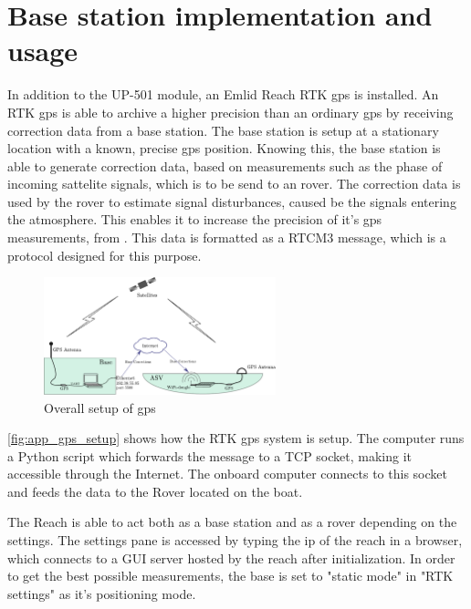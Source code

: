 \section{Base station implementation and usage}
In addition to the UP-501 module, an Emlid Reach RTK gps is installed.
An RTK gps is able to archive a higher precision than an ordinary gps by receiving correction data from a base station.
The base station is setup at a stationary location with a known, precise gps position.
Knowing this, the base station is able to generate correction data, based on measurements such as the phase of incoming sattelite signals, which is to be send to an rover.
The correction data is used by the rover to estimate signal disturbances, caused be the signals entering the atmosphere. 
This enables it to increase the precision of it's gps measurements, from .
This data is formatted as a RTCM3 message, which is a protocol designed for this purpose.
\begin{figure}[H]
	\includegraphics[width=0.6\textwidth]{figures/comunicationSetup.pdf}
	\caption{Overall setup of gps}
	\label{fig:app_gps_setup}
\end{figure}
\autoref{fig:app_gps_setup} shows how the RTK gps system is setup. 
The computer runs a Python script which forwards the message to a TCP socket, making it accessible through the Internet. 
The onboard computer connects to this socket and feeds the data to the Rover located on the boat.

The Reach is able to act both as a base station and as a rover depending on the settings.
The settings pane is accessed by typing the ip of the reach in a browser, which connects to a GUI server hosted by the reach after initialization.
In order to get the best possible measurements, the base is set to "static mode" in "RTK settings" as it's positioning mode.



